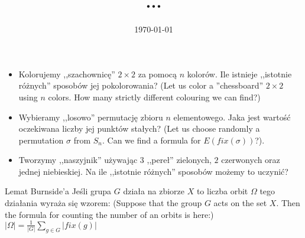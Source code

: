 \documentclass{beamer}
\begin{document}
 
\title[Zliczanie orbit grupy]{
  ...
} 
\author{} 
\date{\today}
\begin{frame} 
  \titlepage 
\end{frame} 
\begin{frame}
\begin{itemize}

\item<1->{
Kolorujemy ,,szachownicę'' $2 \times 2$ za pomocą $n$ kolorów.
Ile istnieje ,,istotnie różnych'' sposobów jej pokolorowania?
(Let us color a ''chessboard'' $2 \times 2$ using $n$ colors.
How many strictly different colouring we can find?)
}
\item<2->{
Wybieramy ,,losowo'' permutację zbioru $n$ elementowego.
Jaka jest wartość oczekiwana liczby jej punktów stałych?
(Let us choose randomly a permutation $\sigma$ from $S_n$. Can we
find a formula for $E(fix(\sigma))$?).
}
\item<3->{
Tworzymy ,,naszyjnik'' używając $3$ ,,pereł'' zielonych, $2$ czerwonych oraz jednej niebieskiej.
Na ile ,,istotnie różnych'' sposobów możemy to uczynić?
}
\end{itemize}
\end{frame}


\begin{frame}
  \begin{block}{Lemat Burnside'a}
    Jeśli grupa $G$ działa na zbiorze $X$ to
    liczba orbit $\Omega$ tego działania
    wyraża się wzorem:
    (Suppose that the group $G$ acts on the set $X$. Then
    the formula for counting the number of an orbits
    is here:)
    $|\Omega| = \frac{1}{|G|} \sum_{g\in G} |fix(g)|$
  \end{block}
\end{frame}
\end{document}
